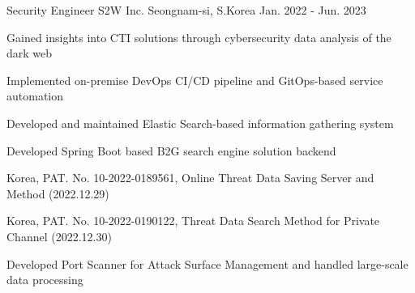 \begin{cventries}
\cventry
    {Security Engineer} %
    {S2W Inc.} %
    {Seongnam-si, S.Korea} %
    {Jan. 2022 - Jun. 2023} %
    {
      \begin{cvitems} %
        \item {Gained insights into CTI solutions through cybersecurity data analysis of the dark web}
        \item {Implemented on-premise DevOps CI/CD pipeline and GitOps-based service automation}
        \item {Developed and maintained Elastic Search-based information gathering system}
        \item {Developed Spring Boot based B2G search engine solution backend}
        \item {Korea, PAT. No. 10-2022-0189561, Online Threat Data Saving Server and Method (2022.12.29)}
        \item {Korea, PAT. No. 10-2022-0190122, Threat Data Search Method for Private Channel (2022.12.30)}
        \item {Developed Port Scanner for Attack Surface Management and handled large-scale data processing}
      \end{cvitems}
    }


\end{cventries}
